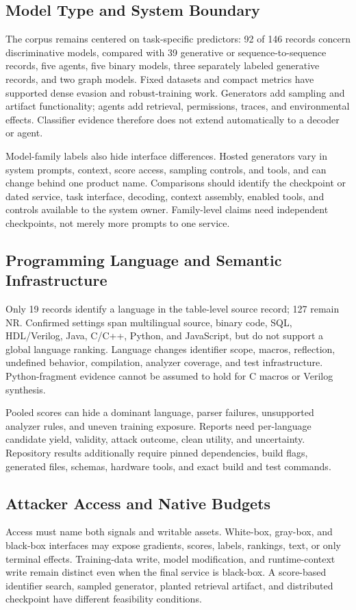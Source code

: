 \documentclass[acmsmall,screen,review]{acmart}
\begin{document}
\subsection{Model Type and System Boundary}
The corpus remains centered on task-specific predictors: 92 of 146 records concern discriminative models, compared with 39 generative or sequence-to-sequence records, five agents, five binary models, three separately labeled generative records, and two graph models. Fixed datasets and compact metrics have supported dense evasion and robust-training work. Generators add sampling and artifact functionality; agents add retrieval, permissions, traces, and environmental effects. Classifier evidence therefore does not extend automatically to a decoder or agent.

Model-family labels also hide interface differences. Hosted generators vary in system prompts, context, score access, sampling controls, and tools, and can change behind one product name. Comparisons should identify the checkpoint or dated service, task interface, decoding, context assembly, enabled tools, and controls available to the system owner. Family-level claims need independent checkpoints, not merely more prompts to one service.

\subsection{Programming Language and Semantic Infrastructure}
Only 19 records identify a language in the table-level source record; 127 remain \textsf{NR}. Confirmed settings span multilingual source, binary code, SQL, HDL/Verilog, Java, C/C++, Python, and JavaScript, but do not support a global language ranking. Language changes identifier scope, macros, reflection, undefined behavior, compilation, analyzer coverage, and test infrastructure. Python-fragment evidence cannot be assumed to hold for C macros or Verilog synthesis.

Pooled scores can hide a dominant language, parser failures, unsupported analyzer rules, and uneven training exposure. Reports need per-language candidate yield, validity, attack outcome, clean utility, and uncertainty. Repository results additionally require pinned dependencies, build flags, generated files, schemas, hardware tools, and exact build and test commands.

\subsection{Attacker Access and Native Budgets}
Access must name both signals and writable assets. White-box, gray-box, and black-box interfaces may expose gradients, scores, labels, rankings, text, or only terminal effects. Training-data write, model modification, and runtime-context write remain distinct even when the final service is black-box. A score-based identifier search, sampled generator, planted retrieval artifact, and distributed checkpoint have different feasibility conditions.
\end{document}
